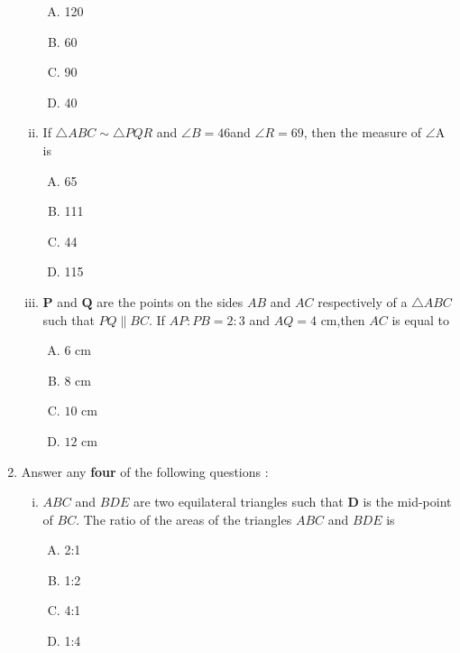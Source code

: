 \documentclass{article}
\let\vec\mathbf
\begin{document}
\begin{enumerate}
\begin{enumerate}[(i)]
        \begin{enumerate}[(A)]
            \item 120\textdegree
            \item 60\textdegree
            \item 90\textdegree
            \item 40\textdegree
        \end{enumerate}
        
        \item If $\triangle ABC\sim\triangle PQR$ and $\angle B=46$\textdegree and $\angle R=69$\textdegree, then the measure of $\angle$A is
        
        \begin{enumerate}[(A)]
            \item 65\textdegree
            \item 111\textdegree
            \item 44\textdegree
            \item 115\textdegree
        \end{enumerate}
        
        \item $\vec{P}$ and $\vec{Q}$ are the points on the sides $AB$ and $AC$ respectively of a $\triangle ABC$ such that $PQ\parallel BC$. If $AP:PB=2:3$ and $AQ=4$ cm,then $AC$ is equal to

        \begin{enumerate}[(A)]
            \item $6$ cm
            \item $8$ cm
            \item $10$ cm
            \item $12$ cm
        \end{enumerate}
        \end{enumerate}
        
        \item Answer any \textbf{four} of the following questions :
        \begin{enumerate}[(i)]
        \item $ABC$ and $BDE$ are two equilateral triangles such that $\vec{D}$ is the mid-point of $BC$. The ratio of the areas of the triangles $ABC$ and $BDE$ is
        \begin{enumerate}[(A)]
            \item 2:1
            \item 1:2
            \item 4:1
            \item 1:4
        \end{enumerate}
        

\end{enumerate}
\end{enumerate}
\end{document}
